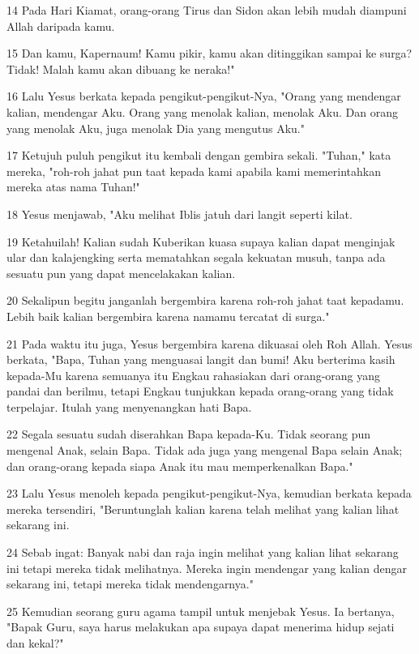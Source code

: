 \par 14 Pada Hari Kiamat, orang-orang Tirus dan Sidon akan lebih mudah diampuni Allah daripada kamu.
\par 15 Dan kamu, Kapernaum! Kamu pikir, kamu akan ditinggikan sampai ke surga? Tidak! Malah kamu akan dibuang ke neraka!"
\par 16 Lalu Yesus berkata kepada pengikut-pengikut-Nya, "Orang yang mendengar kalian, mendengar Aku. Orang yang menolak kalian, menolak Aku. Dan orang yang menolak Aku, juga menolak Dia yang mengutus Aku."
\par 17 Ketujuh puluh pengikut itu kembali dengan gembira sekali. "Tuhan," kata mereka, "roh-roh jahat pun taat kepada kami apabila kami memerintahkan mereka atas nama Tuhan!"
\par 18 Yesus menjawab, "Aku melihat Iblis jatuh dari langit seperti kilat.
\par 19 Ketahuilah! Kalian sudah Kuberikan kuasa supaya kalian dapat menginjak ular dan kalajengking serta mematahkan segala kekuatan musuh, tanpa ada sesuatu pun yang dapat mencelakakan kalian.
\par 20 Sekalipun begitu janganlah bergembira karena roh-roh jahat taat kepadamu. Lebih baik kalian bergembira karena namamu tercatat di surga."
\par 21 Pada waktu itu juga, Yesus bergembira karena dikuasai oleh Roh Allah. Yesus berkata, "Bapa, Tuhan yang menguasai langit dan bumi! Aku berterima kasih kepada-Mu karena semuanya itu Engkau rahasiakan dari orang-orang yang pandai dan berilmu, tetapi Engkau tunjukkan kepada orang-orang yang tidak terpelajar. Itulah yang menyenangkan hati Bapa.
\par 22 Segala sesuatu sudah diserahkan Bapa kepada-Ku. Tidak seorang pun mengenal Anak, selain Bapa. Tidak ada juga yang mengenal Bapa selain Anak; dan orang-orang kepada siapa Anak itu mau memperkenalkan Bapa."
\par 23 Lalu Yesus menoleh kepada pengikut-pengikut-Nya, kemudian berkata kepada mereka tersendiri, "Beruntunglah kalian karena telah melihat yang kalian lihat sekarang ini.
\par 24 Sebab ingat: Banyak nabi dan raja ingin melihat yang kalian lihat sekarang ini tetapi mereka tidak melihatnya. Mereka ingin mendengar yang kalian dengar sekarang ini, tetapi mereka tidak mendengarnya."
\par 25 Kemudian seorang guru agama tampil untuk menjebak Yesus. Ia bertanya, "Bapak Guru, saya harus melakukan apa supaya dapat menerima hidup sejati dan kekal?"
